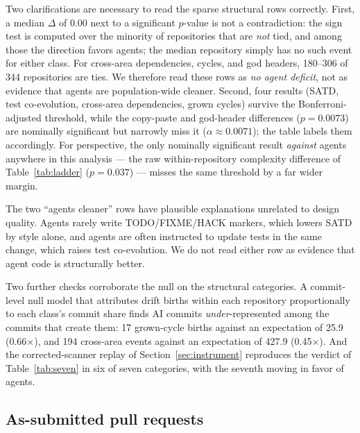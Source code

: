 \documentclass[sigplan,11pt,nonacm=true]{acmart}
\newcommand{\x}{$\times$}
\begin{document}
Two clarifications are necessary to read the sparse structural rows correctly.
First, a median $\Delta$ of $0.00$ next to a significant $p$-value is not a
contradiction: the sign test is computed over the minority of repositories
that are \emph{not} tied, and among those the direction favors agents; the
median repository simply has no such event for either class. For cross-area
dependencies, cycles, and god headers, 180--306 of 344 repositories are ties.
We therefore read these rows as \emph{no agent deficit}, not as evidence that
agents are population-wide cleaner. Second, four results (SATD, test
co-evolution, cross-area dependencies, grown cycles) survive the
Bonferroni-adjusted threshold, while the copy-paste and god-header differences
($p = 0.0073$) are nominally significant but narrowly miss it
($\alpha \approx 0.0071$); the table labels them accordingly. For
perspective, the only nominally significant result \emph{against} agents
anywhere in this analysis --- the raw within-repository complexity difference
of Table~\ref{tab:ladder} ($p = 0.037$) --- misses the same threshold by a
far wider margin.

The two ``agents cleaner'' rows have plausible explanations unrelated to
design quality. Agents rarely write TODO/FIXME/HACK markers, which lowers
SATD by style alone, and agents are often instructed to update tests in the
same change, which raises test co-evolution. We do not read either row as
evidence that agent code is structurally better.

Two further checks corroborate the null on the structural categories. A
commit-level null model that attributes drift births within each repository
proportionally to each class's commit share finds AI commits
\emph{under}-represented among the commits that create them: 17 grown-cycle
births against an expectation of 25.9 (0.66\x), and 194 cross-area events
against an expectation of 427.9 (0.45\x). And the corrected-scanner replay of
Section~\ref{sec:instrument} reproduces the verdict of
Table~\ref{tab:seven} in six of seven categories, with the seventh moving in
favor of agents.

\subsection{As-submitted pull requests}
\label{sec:p5}
\end{document}
